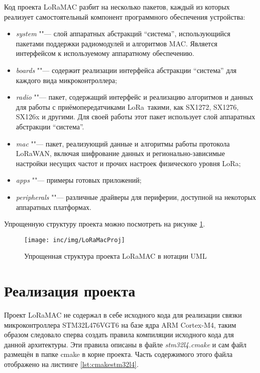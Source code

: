 Код проекта LoRaMAC разбит на несколько пакетов, каждый из которых реализует 
самостоятельный компонент программного обеспечения устройства:
\begin{itemize}
 \item \textit{system} ""--- слой аппаратных абстракций ``система'', 
использующийся пакетами поддержки радиомодулей и алгоритмов MAC. Является 
интерфейсом к используемому аппаратному обеспечению.
 \item \textit{boards} ""--- содержит реализации интерфейса абстракции 
``система'' для каждого вида микроконтроллера;
 \item \textit{radio} ""--- пакет, содержащий интерфейс и реализацию алгоритмов 
и данных для работы с приёмопередатчиками LoRa\texttrademark~такими, как 
SX1272, SX1276, 
SX126x и другими. Для своей работы этот пакет использует слой аппаратных 
абстракции ``система''. 
 \item \textit{mac} ""--- пакет, реализующий данные и алгоритмы работы 
протокола LoRaWAN\texttrademark, включая шифрование данных и 
регионально-зависимые настройки 
несущих частот и прочих настроек физического уровня LoRa\texttrademark;
 \item \textit{apps} ""--- примеры готовых приложений;
 \item \textit{peripherals} ""--- различные драйверы для периферии, доступной 
на некоторых аппаратных платформах.
\end{itemize}

Упрощенную структуру проекта можно посмотреть на рисунке 
\ref{fig:loramacstructure}.

\begin{figure}[!h]
  \centering
  \texttt{[image: inc/img/LoRaMacProj]}
  \caption{Упрощенная структура проекта LoRaMAC в нотации UML}
  \label{fig:loramacstructure}
\end{figure}

\section{Реализация проекта}

Проект LoRaMAC не содержал в себе исходного кода для реализации связки 
микроконтроллера STM32L476VGT6 на базе ядра ARM Cortex-M4, таким образом 
следовало сперва создать правила компиляции исходного кода для данной 
архитектуры. Эти правила описаны в файле \textit{stm32l4.cmake} и сам файл 
размещён в папке cmake в корне проекта. Часть содержимого этого файла 
отображено на листинге \ref{lst:cmakestm32l4}.

